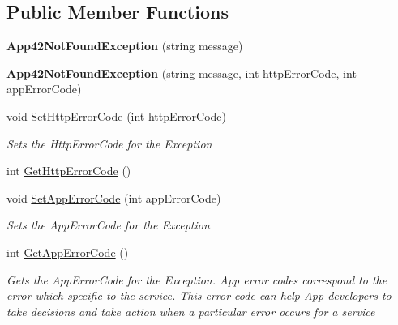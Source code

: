 \subsection*{Public Member Functions}
\begin{DoxyCompactItemize}
\item 
\hypertarget{classcom_1_1shephertz_1_1app42_1_1paas_1_1sdk_1_1windows_1_1_app42_not_found_exception_aefd22cb49d329162768cb52a8efaeb6c}{{\bfseries App42\+Not\+Found\+Exception} (string message)}\label{classcom_1_1shephertz_1_1app42_1_1paas_1_1sdk_1_1windows_1_1_app42_not_found_exception_aefd22cb49d329162768cb52a8efaeb6c}

\item 
\hypertarget{classcom_1_1shephertz_1_1app42_1_1paas_1_1sdk_1_1windows_1_1_app42_not_found_exception_a706c947962f5c0457002d9ea5aad3e95}{{\bfseries App42\+Not\+Found\+Exception} (string message, int http\+Error\+Code, int app\+Error\+Code)}\label{classcom_1_1shephertz_1_1app42_1_1paas_1_1sdk_1_1windows_1_1_app42_not_found_exception_a706c947962f5c0457002d9ea5aad3e95}

\item 
void \hyperlink{classcom_1_1shephertz_1_1app42_1_1paas_1_1sdk_1_1windows_1_1_app42_not_found_exception_ac18ee3c2b9f25ab027a8dbbcae500ada}{Set\+Http\+Error\+Code} (int http\+Error\+Code)
\begin{DoxyCompactList}\small\item\em Sets the Http\+Error\+Code for the Exception \end{DoxyCompactList}\item 
int \hyperlink{classcom_1_1shephertz_1_1app42_1_1paas_1_1sdk_1_1windows_1_1_app42_not_found_exception_a46e6572a2c325e347665eb7265103003}{Get\+Http\+Error\+Code} ()
\item 
void \hyperlink{classcom_1_1shephertz_1_1app42_1_1paas_1_1sdk_1_1windows_1_1_app42_not_found_exception_a29bafd163df825b22c19521ae3989cf1}{Set\+App\+Error\+Code} (int app\+Error\+Code)
\begin{DoxyCompactList}\small\item\em Sets the App\+Error\+Code for the Exception \end{DoxyCompactList}\item 
int \hyperlink{classcom_1_1shephertz_1_1app42_1_1paas_1_1sdk_1_1windows_1_1_app42_not_found_exception_ab4a8493e2304e073cced7cc07e233ca5}{Get\+App\+Error\+Code} ()
\begin{DoxyCompactList}\small\item\em Gets the App\+Error\+Code for the Exception. App error codes correspond to the error which specific to the service. This error code can help App developers to take decisions and take action when a particular error occurs for a service \end{DoxyCompactList}\end{DoxyCompactItemize}


